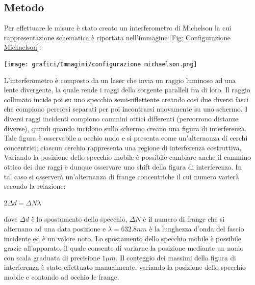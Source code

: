 \documentclass[a4paper]{article}
\begin{document}
\subsection{Metodo}
Per effettuare le misure è stato creato un interferometro di Michelson la cui rappresentazione schematica è riportata nell'immagine \ref{Fig: Configurazione Michaelson}:
\begin{center}
	\texttt{[image: grafici/Immagini/configurazione michaelson.png]}
\label{Fig: Configurazione Michaelson}
\end{center}
L'interferometro è composto da un laser che invia un raggio luminoso ad una lente divergente, la quale rende i raggi della sorgente paralleli fra di loro. Il raggio collimato incide poi su uno specchio semi-riflettente creando così due diversi fasci che compiono percorsi separati per poi incontrarsi nuovamente su uno schermo. I diversi raggi incidenti compiono cammini ottici differenti (percorrono distanze diverse), quindi quando incidono sullo schermo creano una figura di interferenza. Tale figura è osservabile a occhio nudo e si presenta come un'alternanza di cerchi concentrici; ciascun cerchio rappresenta una regione di interferenza costruttiva. Variando la posizione dello specchio mobile è possibile cambiare anche il cammino ottico dei due raggi e dunque osservare uno shift della figura di interferenza. In tal caso si osserverà un'alternanza di frange concentriche il cui numero varierà secondo la relazione: 
\begin{center}
    $2 \Delta d=\Delta N \lambda $
\end{center}
dove $\Delta d$ è lo spostamento dello specchio, $\Delta N$ è il numero di frange che si alternano ad una data posizione e $\lambda=632.8 nm$ è la lunghezza d'onda del fascio incidente ed è un valore noto. Lo spostamento dello specchio mobile è possibile grazie all'apparato, il quale consente di variarne la posizione mediante un nonio con scala graduata di precisione $1 \mu m$. Il conteggio dei massimi della figura di interferenza è stato effettuato manualmente, variando la posizione dello specchio mobile e contando ad occhio le frange.
\end{document}
